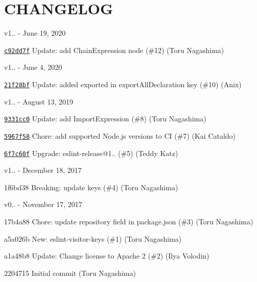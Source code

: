 \chapter{CHANGELOG}
\hypertarget{md__c_1_2_users_2_s_t_r_i_d_e_r_2source_2repos_2_internal_a_p_i_2_internal_a_p_i_2wwwroot_2lib_2d0a1c65be2e6eafd071ada9f7c2d4c6e}{}\label{md__c_1_2_users_2_s_t_r_i_d_e_r_2source_2repos_2_internal_a_p_i_2_internal_a_p_i_2wwwroot_2lib_2d0a1c65be2e6eafd071ada9f7c2d4c6e}
v1.. -\/ June 19, 2020


\begin{DoxyItemize}
\item \href{https://github.com/eslint/eslint-visitor-keys/commit/c92dd7ff96f0044dba12d681406a025b92b4c437}{\texttt{ {\ttfamily c92dd7f}}} Update\+: add {\ttfamily Chain\+Expression} node (\#12) (Toru Nagashima)
\end{DoxyItemize}

v1.. -\/ June 4, 2020


\begin{DoxyItemize}
\item \href{https://github.com/eslint/eslint-visitor-keys/commit/21f28bf11be5329d740a8bf6bdbcd0ef13bbf1a2}{\texttt{ {\ttfamily 21f28bf}}} Update\+: added exported in export\+All\+Declaration key (\#10) (Anix)
\end{DoxyItemize}

v1.. -\/ August 13, 2019


\begin{DoxyItemize}
\item \href{https://github.com/eslint/eslint-visitor-keys/commit/9331cc09e756e65b9044c9186445a474b037fac6}{\texttt{ {\ttfamily 9331cc0}}} Update\+: add Import\+Expression (\#8) (Toru Nagashima)
\item \href{https://github.com/eslint/eslint-visitor-keys/commit/5967f583b04f17fba9226aaa394e45d476d2b8af}{\texttt{ {\ttfamily 5967f58}}} Chore\+: add supported Node.\+js versions to CI (\#7) (Kai Cataldo)
\item \href{https://github.com/eslint/eslint-visitor-keys/commit/6f7c60fef2ceec9f6323202df718321cec45cab0}{\texttt{ {\ttfamily 6f7c60f}}} Upgrade\+: eslint-\/release@1.. (\#5) (Teddy Katz)
\end{DoxyItemize}

v1.. -\/ December 18, 2017


\begin{DoxyItemize}
\item 1f6bd38 Breaking\+: update keys (\#4) (Toru Nagashima)
\end{DoxyItemize}

v0.. -\/ November 17, 2017


\begin{DoxyItemize}
\item 17b4a88 Chore\+: update {\ttfamily repository} field in package.\+json (\#3) (Toru Nagashima)
\item a5a026b New\+: eslint-\/visitor-\/keys (\#1) (Toru Nagashima)
\item a1a48b8 Update\+: Change license to Apache 2 (\#2) (Ilya Volodin)
\item 2204715 Initial commit (Toru Nagashima) 
\end{DoxyItemize}